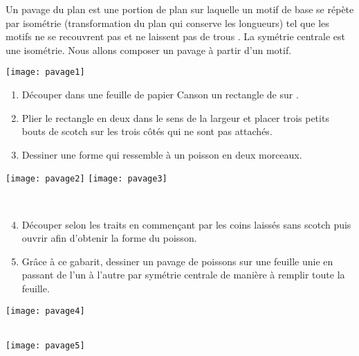    Un pavage du plan est une portion de plan sur laquelle un motif de base se répète par isométrie (transformation du plan qui conserve les longueurs) tel que les motifs ne se recouvrent pas et ne laissent pas de \og trous \fg. La symétrie centrale est une isométrie. Nous allons composer un pavage à partir d'un motif.
   \begin{center}
      \begin{minipage}{5cm}
         \texttt{[image: pavage1]}
      \end{minipage}
      \qquad
      \begin{minipage}{5cm}
         \begin{enumerate}
            \item Découper dans une feuille de papier Canson un rectangle de  sur . \smallskip
            \item Plier le rectangle en deux dans le sens de la largeur et placer trois petits bouts de scotch sur les trois côtés qui ne sont pas attachés. \smallskip
            \item Dessiner une forme qui ressemble à un poisson en deux morceaux.
         \end{enumerate}
      \end{minipage}
      \qquad
      \begin{minipage}{5cm}
         \texttt{[image: pavage2]}
         \texttt{[image: pavage3]}
      \end{minipage} \\ \medskip
      \begin{minipage}{7cm}
         \begin{enumerate}
            \setcounter{enumi}{3}
            \item Découper selon les traits en commençant par les coins laissés sans scotch puis ouvrir afin d'obtenir la forme du poisson. \smallskip
            \item Grâce à ce gabarit, dessiner un pavage de poissons sur une feuille unie en passant de l'un à l'autre par symétrie centrale de manière à remplir toute la feuille.
         \end{enumerate}
       \end{minipage}
      \qquad
      \begin{minipage}{9cm}
         \texttt{[image: pavage4]} 
      \end{minipage}
      \ \\ [5mm]
      \texttt{[image: pavage5]}
   \end{center}
 
